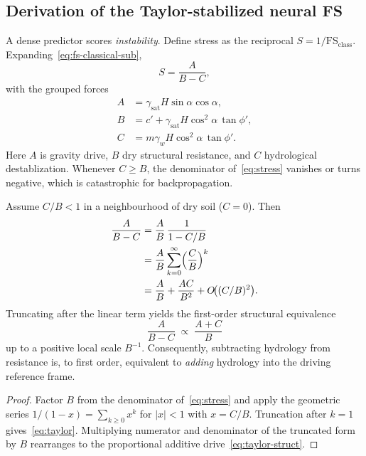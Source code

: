 \subsection{Derivation of the Taylor-stabilized neural FS}
\label{sec:taylor-derivation}
A dense predictor scores \emph{instability}. Define stress as the reciprocal \(S=1/\mathrm{FS}_{\mathrm{class}}\). Expanding~\eqref{eq:fs-classical-sub},
\begin{equation}
\label{eq:stress}
S=\frac{A}{B-C},
\end{equation}
with the grouped forces
\begin{equation}
\label{eq:ABC}
\begin{aligned}
A&=\gamma_{\mathrm{sat}}H\sin\alpha\cos\alpha,\\
B&=c'+\gamma_{\mathrm{sat}}H\cos^{2}\alpha\,\tan\phi',\\
C&=m\gamma_w H\cos^{2}\alpha\,\tan\phi'.
\end{aligned}
\end{equation}
Here \(A\) is gravity drive, \(B\) dry structural resistance, and \(C\) hydrological destablization. Whenever \(C\ge B\), the denominator of~\eqref{eq:stress} vanishes or turns negative, which is catastrophic for backpropagation.

\begin{proposition}
\label{prop:taylor}
Assume \(C/B<1\) in a neighbourhood of dry soil (\(C=0\)). Then
\begin{equation}
\label{eq:taylor}
\begin{split}
\frac{A}{B-C}
&=
\frac{A}{B}\,\frac{1}{1-C/B}\\
&=
\frac{A}{B}\sum_{k=0}^{\infty}
\Bigl(\frac{C}{B}\Bigr)^{k}\\
&=
\frac{A}{B}+\frac{AC}{B^{2}}
+O\!\bigl((C/B)^{2}\bigr).
\end{split}
\end{equation}
Truncating after the linear term yields the first-order structural equivalence
\begin{equation}
\label{eq:taylor-struct}
\frac{A}{B-C}\;\propto\;\frac{A+C}{B}
\end{equation}
up to a positive local scale \(B^{-1}\). Consequently, subtracting hydrology from resistance is, to first order, equivalent to \emph{adding} hydrology into the driving reference frame.
\end{proposition}
\begin{proof}
Factor \(B\) from the denominator of~\eqref{eq:stress} and apply the geometric series \(1/(1-x)=\sum_{k\ge0}x^{k}\) for \(|x|<1\) with \(x=C/B\). Truncation after \(k=1\) gives~\eqref{eq:taylor}. Multiplying numerator and denominator of the truncated form by \(B\) rearranges to the proportional additive drive~\eqref{eq:taylor-struct}.
\end{proof}

